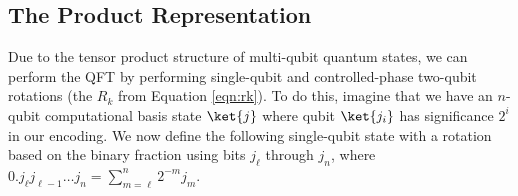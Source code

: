 


\subsection{The Product Representation}


Due to the tensor product structure of multi-qubit quantum states, we can
perform the QFT by performing single-qubit and controlled-phase two-qubit
rotations (the $R_k$ from Equation \ref{eqn:rk}). To do this, imagine that
we have an $n$-qubit computational basis state $\ket{j}$ where
qubit $\ket{j_i}$ has significance $2^i$ in our encoding. We now define the
following single-qubit state with a rotation based on the binary fraction
using bits $j_\ell$ through $j_n$, where $0.j_{\ell} j_{\ell-1} \ldots j_{n} =
\sum_{m=\ell}^n 2^{-m}j_m$.

